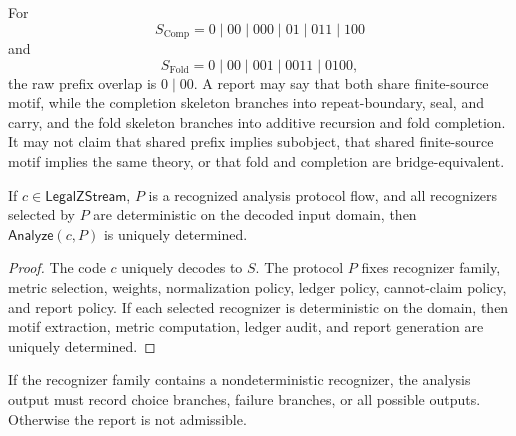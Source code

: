 \begin{example}
\label{ex:analysis-pipeline-compare-completion-fold}
For
$$
  S_{\mathrm{Comp}}=0\mid 00\mid 000\mid 01\mid 011\mid 100
$$
and
$$
  S_{\mathrm{Fold}}=0\mid 00\mid 001\mid 0011\mid 0100,
$$
the raw prefix overlap is $0\mid 00$. A report may say that both share finite-source motif, while the completion skeleton branches into repeat-boundary, seal, and carry, and the fold skeleton branches into additive recursion and fold completion. It may not claim that shared prefix implies subobject, that shared finite-source motif implies the same theory, or that fold and completion are bridge-equivalent.
\end{example}

\begin{theorem}
\label{thm:analysis-pipeline-deterministic-relative-protocol}
If $c\in\mathsf{LegalZStream}$, $P$ is a recognized analysis protocol flow, and all recognizers selected by $P$ are deterministic on the decoded input domain, then $\mathsf{Analyze}(c,P)$ is uniquely determined.
\end{theorem}

\begin{proof}
The code $c$ uniquely decodes to $S$. The protocol $P$ fixes recognizer family, metric selection, weights, normalization policy, ledger policy, cannot-claim policy, and report policy. If each selected recognizer is deterministic on the domain, then motif extraction, metric computation, ledger audit, and report generation are uniquely determined.
\end{proof}

\begin{corollary}
\label{cor:analysis-pipeline-nondeterminism-ledger}
If the recognizer family contains a nondeterministic recognizer, the analysis output must record choice branches, failure branches, or all possible outputs. Otherwise the report is not admissible.
\end{corollary}

